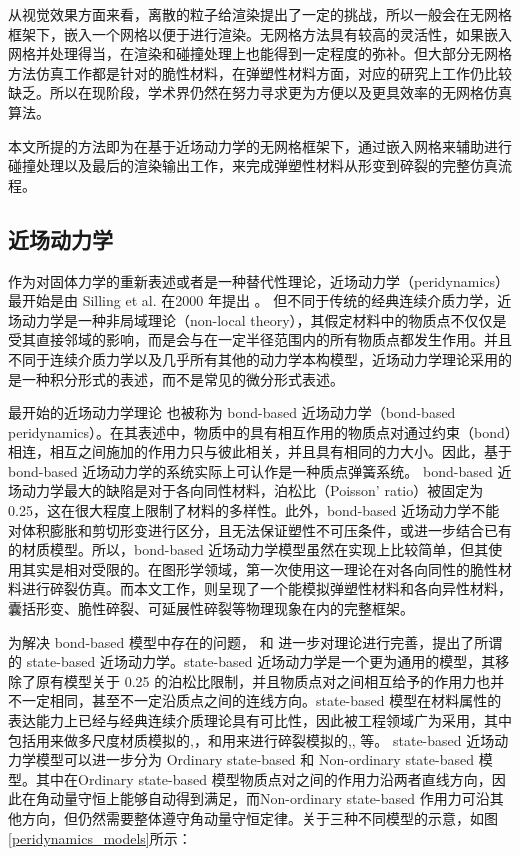 从视觉效果方面来看，离散的粒子给渲染提出了一定的挑战，所以一般会在无网格框架下，嵌入一个网格以便于进行渲染。无网格方法具有较高的灵活性，如果嵌入网格并处理得当，在渲染和碰撞处理上也能得到一定程度的弥补。但大部分无网格方法仿真工作都是针对的脆性材料，在弹塑性材料方面，对应的研究上工作仍比较缺乏。所以在现阶段，学术界仍然在努力寻求更为方便以及更具效率的无网格仿真算法。

本文所提的方法即为在基于近场动力学的无网格框架下，通过嵌入网格来辅助进行碰撞处理以及最后的渲染输出工作，来完成弹塑性材料从形变到碎裂的完整仿真流程。

\subsection{近场动力学}
\label{pdm_history}

作为对固体力学的重新表述或者是一种替代性理论，近场动力学（peridynamics）最开始是由 Silling et al. 在2000 年提出 。 但不同于传统的经典连续介质力学，近场动力学是一种非局域理论（non-local theory），其假定材料中的物质点不仅仅是受其直接邻域的影响，而是会与在一定半径范围内的所有物质点都发生作用。并且不同于连续介质力学以及几乎所有其他的动力学本构模型，近场动力学理论采用的是一种积分形式的表述，而不是常见的微分形式表述。

最开始的近场动力学理论 也被称为 bond-based 近场动力学（bond-based peridynamics）。在其表述中，物质中的具有相互作用的物质点对通过约束（bond）相连，相互之间施加的作用力只与彼此相关，并且具有相同的力大小。因此，基于 bond-based 近场动力学的系统实际上可认作是一种质点弹簧系统。 bond-based 近场动力学最大的缺陷是对于各向同性材料，泊松比（Poisson' ratio）被固定为 0.25，这在很大程度上限制了材料的多样性。此外，bond-based 近场动力学不能对体积膨胀和剪切形变进行区分，且无法保证塑性不可压条件，或进一步结合已有的材质模型。所以，bond-based 近场动力学模型虽然在实现上比较简单，但其使用其实是相对受限的。在图形学领域，第一次使用这一理论在对各向同性的脆性材料进行碎裂仿真。而本文工作，则呈现了一个能模拟弹塑性材料和各向异性材料，囊括形变、脆性碎裂、可延展性碎裂等物理现象在内的完整框架。

为解决 bond-based 模型中存在的问题， 和 进一步对理论进行完善，提出了所谓的 state-based 近场动力学。state-based 近场动力学是一个更为通用的模型，其移除了原有模型关于 0.25 的泊松比限制，并且物质点对之间相互给予的作用力也并不一定相同，甚至不一定沿质点之间的连线方向。state-based 模型在材料属性的表达能力上已经与经典连续介质理论具有可比性，因此被工程领域广为采用，其中包括用来做多尺度材质模拟的,，和用来进行碎裂模拟的,, 等。
state-based 近场动力学模型可以进一步分为 Ordinary state-based 和 Non-ordinary state-based 模型。其中在Ordinary state-based 模型物质点对之间的作用力沿两者直线方向，因此在角动量守恒上能够自动得到满足，而Non-ordinary state-based 作用力可沿其他方向，但仍然需要整体遵守角动量守恒定律。关于三种不同模型的示意，如图\ref{peridynamics_models}所示：

